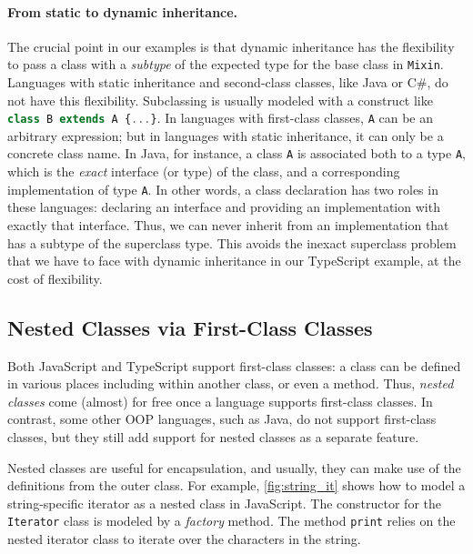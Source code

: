 \paragraph{From static to dynamic inheritance.}
The crucial point in our examples is that dynamic inheritance has the
flexibility to pass a class with a \emph{subtype} of the expected type for the
base class in \lstinline{Mixin}. Languages with static inheritance and
second-class classes, like Java or C\#, do not have this flexibility.
Subclassing is usually modeled with a construct like
\lstinline[language=TypeScript]|class B extends A {...}|. In languages with
first-class classes, \lstinline{A} can be an arbitrary expression; but in
languages with static inheritance, it can only be a concrete class name. In
Java, for instance, a class \lstinline{A} is associated both to a type
\lstinline{A}, which is the \emph{exact} interface (or type) of the class, and a
corresponding implementation of type \lstinline{A}. In other words, a class
declaration has two roles in these languages: declaring an interface and
providing an implementation with exactly that interface. Thus, we can never
inherit from an implementation that has a subtype of the superclass type. This
avoids the inexact superclass problem that we have to face with dynamic
inheritance in our TypeScript example, at the cost of flexibility.

\subsection{Nested Classes via First-Class Classes}

Both JavaScript and TypeScript support first-class classes: a class can be
defined in various places including within another class, or even a method.
Thus, \emph{nested classes} come (almost) for free once a language supports
first-class classes. In contrast, some other OOP languages, such as Java, do not
support first-class classes, but they still add support for nested classes as a
separate feature.

Nested classes are useful for encapsulation, and usually, they can make use of
the definitions from the outer class. For example, \autoref{fig:string_it} shows
how to model a string-specific iterator as a nested class in JavaScript. The
constructor for the \lstinline{Iterator} class is modeled by a \emph{factory}
method. The method \lstinline{print} relies on the nested iterator class to
iterate over the characters in the string.

